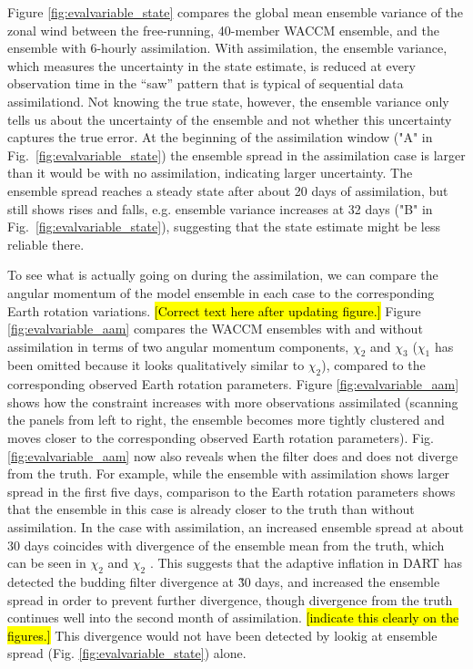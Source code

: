 Figure \ref{fig:evalvariable_state} compares the global mean ensemble variance of the zonal wind between the free-running, 40-member WACCM ensemble, and the ensemble with 6-hourly assimilation. 
With assimilation, the ensemble variance, which measures the uncertainty in the state estimate, is reduced at every observation time in the ``saw'' pattern that is typical of sequential data assimilationd.
Not knowing the true state, however, the ensemble variance only tells us about the uncertainty of the ensemble and not whether this uncertainty captures the true error. 
At the beginning of the assimilation window ("A" in Fig.~\ref{fig:evalvariable_state}) the ensemble spread in the assimilation case is larger than it would be with no assimilation, indicating larger uncertainty. 
The ensemble spread reaches a steady state after about 20 days of assimilation, but still shows rises and falls, e.g. ensemble variance increases at 32 days ("B" in Fig.~\ref{fig:evalvariable_state}), suggesting that the state estimate might be less reliable there. 

To see what is actually going on during the assimilation, we can compare the angular momentum of the model ensemble in each case to the corresponding Earth rotation variations. 
\hl{[Correct text here after updating figure.]}
Figure \ref{fig:evalvariable_aam} compares the WACCM ensembles with and without assimilation in terms of two angular momentum components, $\chi_2$ and $\chi_3$ ($\chi_1$ has been omitted because it looks qualitatively similar to $\chi_2$),  
compared to the corresponding observed Earth rotation parameters. 
Figure  \ref{fig:evalvariable_aam} shows how the constraint increases with more observations assimilated (scanning the panels from left to right, the ensemble becomes more tightly clustered and moves closer to the corresponding observed Earth rotation parameters). 
Fig. \ref{fig:evalvariable_aam} now also reveals when the filter does and does not diverge from the truth.  
For example, while the ensemble with assimilation shows larger spread in the first five days, comparison to the Earth rotation parameters shows that the ensemble in this case is already closer to the truth than without assimilation. 
In the case with assimilation, an increased ensemble spread at about 30 days coincides with divergence of the ensemble mean from the truth, which can be seen in $\chi_2$ and $\chi_2$ . 
This suggests that the adaptive inflation in DART has detected the budding filter divergence at \~30 days, and increased the ensemble spread in order to prevent further divergence, though divergence from the truth continues well into the second month of assimilation.
\hl{[indicate this clearly on the figures.]}
This divergence would not have been detected by lookig at ensemble spread (Fig. \ref{fig:evalvariable_state}) alone. 

